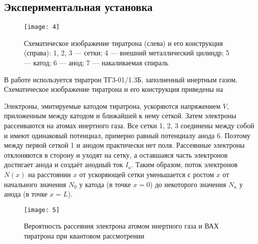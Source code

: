 \documentclass[a4paper, 12pt]{article}
\begin{document}
\subsection{Экспериментальная установка}


\begin{figure}[H]
\begin{minipage}[b]{0.4\linewidth}
    \texttt{[image: 4]}
    \caption{Схематическое изображение тиратрона (слева) и его
    конструкция (справа): 1, 2, 3 --- сетки; 4 --- внешний
металлический цилиндр; 5 --- катод; 6 --- анод; 7 --- накаливаемая
спираль}
\label{fig:4}
\end{minipage}
\end{figure}



В работе используется тиратрон ТГ3-01/1.3Б, заполненный инертным
газом. Схематическое изображение тиратрона и его конструкция приведены
на 

Электроны, эмитируемые катодом тиратрона, ускоряются напряжением $V$,
приложенным между катодом и ближайшей к нему сеткой. Затем электроны
рассеиваются на атомах инертного газа. Все сетки 1, 2, 3 соединены
между собой и имеют одинаковый потенциал, примерно равный потенциалу
анода 6. Поэтому между первой сеткой 1 и анодом практически нет поля.
Рассеянные электроны отклоняются в сторону и уходят на сетку, а
оставшаяся часть электронов достигает анода и создаёт анодный ток
$I_a$. Таким образом, поток электронов $N(x)$ на расстоянии $x$ от
ускоряющей сетки уменьшается с ростом $x$ от начального значения $N_0$
у катода (в точке $x=0$) до некоторого значения $N_a$ у анода (в точке
$x = L$).

\begin{wrapfigure}{r}{0.35\linewidth}
    \texttt{[image: 5]}
    \caption{Вероятность рассеяния электрона атомом инертного газа и
    ВАХ тиратрона при квантовом рассмотрении}
    \label{fig:5}
\end{wrapfigure}
\end{document}

